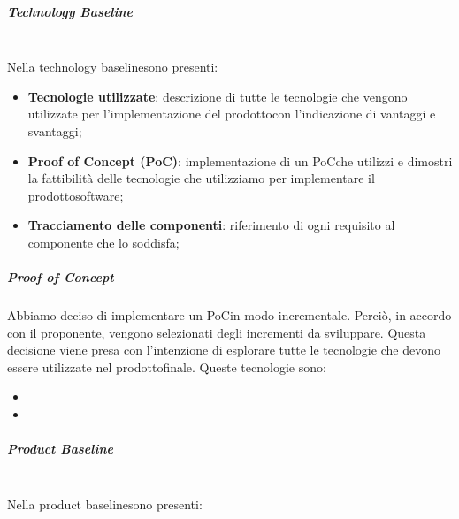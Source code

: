 \subparagraph*{Technology Baseline}\mbox{}\\ [1mm]
Nella technology baseline\glosp sono presenti:
\begin{itemize}
	\item \textbf{Tecnologie utilizzate}: descrizione di tutte le tecnologie che vengono utilizzate per l'implementazione del prodotto\glosp con l'indicazione di vantaggi e svantaggi;
	\item \textbf{Proof of Concept (PoC)}: implementazione di un PoC\glosp che utilizzi e dimostri la fattibilità delle tecnologie che utilizziamo per implementare il prodotto\glosp software;
	\item \textbf{Tracciamento delle componenti}: riferimento di ogni requisito al componente che lo soddisfa;
\end{itemize}
\subparagraph*{Proof of Concept}
Abbiamo deciso di implementare un PoC\glosp in modo incrementale. Perciò, in accordo con il proponente, vengono selezionati degli incrementi da sviluppare. Questa decisione viene presa con l'intenzione di esplorare tutte le tecnologie che devono essere utilizzate nel prodotto\glosp finale. Queste tecnologie sono:
\begin{itemize}
	\item %
	\item
\end{itemize}
\subparagraph*{Product Baseline}\mbox{}\\ [1mm]
Nella product baseline\glosp sono presenti:
